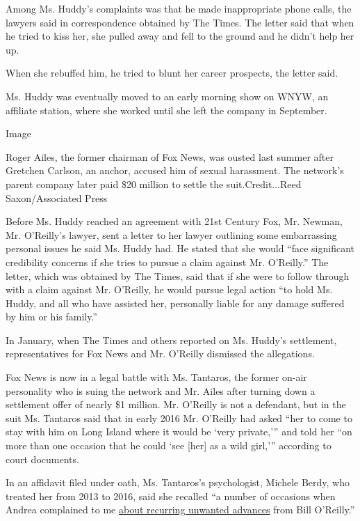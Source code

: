 Among Ms. Huddy's complaints was that he made inappropriate phone calls,
the lawyers said in correspondence obtained by The Times. The letter
said that when he tried to kiss her, she pulled away and fell to the
ground and he didn't help her up.

When she rebuffed him, he tried to blunt her career prospects, the
letter said.

Ms. Huddy was eventually moved to an early morning show on WNYW, an
affiliate station, where she worked until she left the company in
September.

Image

Roger Ailes, the former chairman of Fox News, was ousted last summer
after Gretchen Carlson, an anchor, accused him of sexual harassment. The
network's parent company later paid \$20 million to settle the
suit.Credit...Reed Saxon/Associated Press

Before Ms. Huddy reached an agreement with 21st Century Fox, Mr. Newman,
Mr. O'Reilly's lawyer, sent a letter to her lawyer outlining some
embarrassing personal issues he said Ms. Huddy had. He stated that she
would ``face significant credibility concerns if she tries to pursue a
claim against Mr. O'Reilly.'' The letter, which was obtained by The
Times, said that if she were to follow through with a claim against Mr.
O'Reilly, he would pursue legal action ``to hold Ms. Huddy, and all who
have assisted her, personally liable for any damage suffered by him or
his family.''

In January, when The Times and others reported on Ms. Huddy's
settlement, representatives for Fox News and Mr. O'Reilly dismissed the
allegations.

Fox News is now in a legal battle with Ms. Tantaros, the former on-air
personality who is suing the network and Mr. Ailes after turning down a
settlement offer of nearly \$1 million. Mr. O'Reilly is not a defendant,
but in the suit Ms. Tantaros said that in early 2016 Mr. O'Reilly had
asked ``her to come to stay with him on Long Island where it would be
`very private,''' and told her ``on more than one occasion that he could
`see {[}her{]} as a wild girl,''' according to court documents.

In an affidavit filed under oath, Ms. Tantaros's psychologist, Michele
Berdy, who treated her from 2013 to 2016, said she recalled ``a number
of occasions when Andrea complained to me
\href{http://www.nydailynews.com/entertainment/tv/tantaros-ex-therapist-backs-ailes-sexual-harassment-claims-article-1.2810182}{about
recurring unwanted advances} from Bill O'Reilly.''


